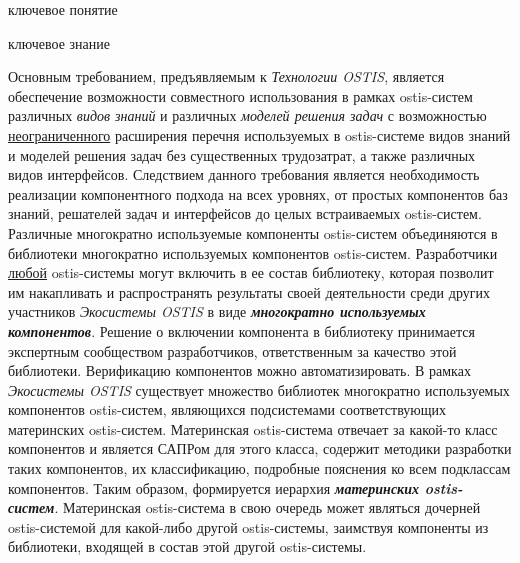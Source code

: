 \begin{SCn}
\begin{scnrelfromlist}{ключевое понятие}
\end{scnrelfromlist}
\end{SCn}

\bigskip

\begin{SCn}
\begin{scnrelfromlist}{ключевое знание}
\end{scnrelfromlist}
\end{SCn}

\bigskip

Основным требованием, предъявляемым к \textit{Технологии OSTIS}, является обеспечение возможности совместного использования в рамках ostis-систем различных \textit{видов знаний} и различных \textit{моделей решения задач} с возможностью \underline{неограниченного} расширения перечня используемых в ostis-системе видов знаний и моделей решения задач без существенных трудозатрат, а также различных видов интерфейсов. Следствием данного требования является необходимость реализации компонентного подхода на всех уровнях, от простых компонентов баз знаний, решателей задач и интерфейсов до целых встраиваемых ostis-систем. Различные многократно используемые компоненты ostis-систем объединяются в библиотеки многократно используемых компонентов ostis-систем. Разработчики \underline{любой} ostis-системы могут включить в ее состав библиотеку, которая позволит им накапливать и распространять результаты своей деятельности среди других участников \textit{Экосистемы OSTIS} в виде \textbf{\textit{многократно используемых компонентов}}. Решение о включении компонента в библиотеку принимается экспертным сообществом разработчиков, ответственным за качество этой библиотеки. Верификацию компонентов можно автоматизировать.
В рамках \textit{Экосистемы OSTIS} существует множество библиотек многократно используемых компонентов ostis-систем, являющихся подсистемами соответствующих материнских ostis-систем. Материнская ostis-система отвечает за какой-то класс компонентов и является САПРом для этого класса, содержит методики разработки таких компонентов, их классификацию, подробные пояснения ко всем подклассам компонентов. Таким образом, формируется иерархия \textbf{\textit{материнских ostis-систем}}. Материнская ostis-система в свою очередь может являться дочерней ostis-системой для какой-либо другой ostis-системы, заимствуя компоненты из библиотеки, входящей в состав этой другой ostis-системы.

